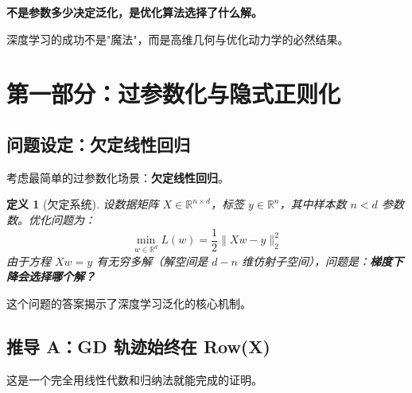 \documentclass[12pt, a4paper]{ctexart}
\newtheorem{definition}[theorem]{定义}
\begin{document}
\begin{keypoint}[本周的核心信息]
\textbf{不是参数多少决定泛化，是优化算法选择了什么解。}

深度学习的成功不是"魔法"，而是高维几何与优化动力学的必然结果。
\end{keypoint}

\section{第一部分：过参数化与隐式正则化}

\subsection{问题设定：欠定线性回归}

考虑最简单的过参数化场景：\textbf{欠定线性回归}。

\begin{definition}[欠定系统]
设数据矩阵 $X \in \mathbb{R}^{n \times d}$，标签 $y \in \mathbb{R}^n$，其中样本数 $n < d$ 参数数。优化问题为：
\[
\min_{w \in \mathbb{R}^d} L(w) = \frac{1}{2}\|Xw - y\|_2^2
\]
由于方程 $Xw = y$ 有无穷多解（解空间是 $d-n$ 维仿射子空间），问题是：\textbf{梯度下降会选择哪个解？}
\end{definition}

这个问题的答案揭示了深度学习泛化的核心机制。

\subsection{推导 A：GD 轨迹始终在 Row(X)}

这是一个完全用线性代数和归纳法就能完成的证明。
\end{document}
